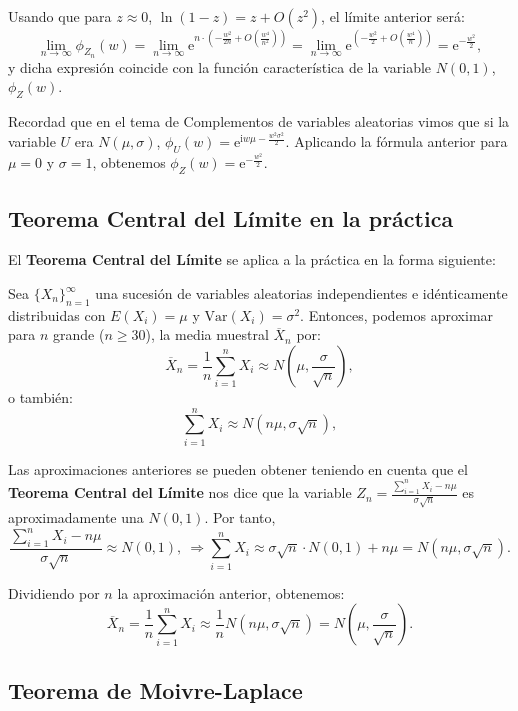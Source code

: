 \documentclass[
  letterpaper,
  DIV=11,
  numbers=noendperiod]{scrreprt}
\begin{document}
Usando que para \(z\approx 0\), \(\ln(1-z)=z+O(z^2)\), el límite
anterior será: \[
\lim_{n\to \infty}\phi_{Z_n}(w) = 
\lim_{n\to \infty}\mathrm{e}^{n\cdot \left(-\frac{w^2}{2n}+O\left(\frac{w^4}{n^{2}}\right)\right)} = \lim_{n\to \infty}\mathrm{e}^{ \left(-\frac{w^2}{2}+O\left(\frac{w^4}{n}\right)\right)} = \mathrm{e}^{-\frac{w^2}{2}},
\] y dicha expresión coincide con la función característica de la
variable \(N(0,1)\), \(\phi_{Z}(w)\).

Recordad que en el tema de Complementos de variables aleatorias vimos
que si la variable \(U\) era \(N(\mu,\sigma)\),
\(\phi_{U}(w)=\mathrm{e}^{\mathrm{i}w\mu-\frac{w^2\sigma^2}{2}}\).
Aplicando la fórmula anterior para \(\mu=0\) y \(\sigma=1\), obtenemos
\(\phi_{Z}(w)=\mathrm{e}^{-\frac{w^2}{2}}.\)

\hypertarget{teorema-central-del-luxedmite-en-la-pruxe1ctica}{%
\subsection{Teorema Central del Límite en la
práctica}\label{teorema-central-del-luxedmite-en-la-pruxe1ctica}}

El \textbf{Teorema Central del Límite} se aplica a la práctica en la
forma siguiente:

Sea \(\{X_n\}_{n=1}^\infty\) una sucesión de variables aleatorias
independientes e idénticamente distribuidas con \(E(X_i)=\mu\) y
\(\mathrm{Var}(X_i)=\sigma^2\). Entonces, podemos aproximar para \(n\)
grande (\(n\geq 30\)), la media muestral \(\overline{X}_n\) por: \[
\overline{X}_n =\frac{1}{n}\sum_{i=1}^n X_i \approx N\left(\mu,\frac{\sigma}{\sqrt{n}}\right),
\] o también: \[
\sum_{i=1}^n X_i \approx N\left(n\mu,\sigma\sqrt{n}\right),
\]

Las aproximaciones anteriores se pueden obtener teniendo en cuenta que
el \textbf{Teorema Central del Límite} nos dice que la variable
\(Z_n= \frac{\sum\limits_{i=1}^n X_i-n\mu}{\sigma\sqrt{n}}\) es
aproximadamente una \(N(0,1)\). Por tanto, \[
\frac{\sum\limits_{i=1}^n X_i-n\mu}{\sigma\sqrt{n}} \approx N(0,1),\ \Rightarrow \sum_{i=1}^n X_i\approx \sigma\sqrt{n}\cdot N(0,1)+n\mu = N\left(n\mu,\sigma\sqrt{n}\right).
\]

Dividiendo por \(n\) la aproximación anterior, obtenemos: \[
\overline{X}_n =\frac{1}{n}\sum_{i=1}^n X_i \approx \frac{1}{n}N\left(n\mu,\sigma\sqrt{n}\right) =N\left(\mu,\frac{\sigma}{\sqrt{n}}\right).
\]

\hypertarget{teorema-de-moivre-laplace}{%
\subsection{Teorema de Moivre-Laplace}\label{teorema-de-moivre-laplace}}
\end{document}
